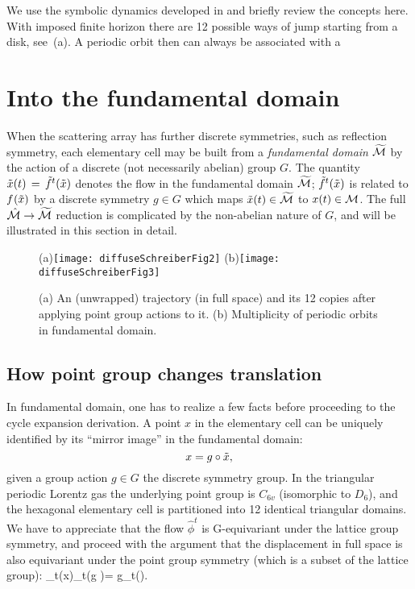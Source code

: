 \documentclass[aps,pre,showpacs,preprint,groupedaddress,floatfix]{revtex4-1}
\begin{document}
We use the symbolic dynamics developed in  and briefly
review the concepts here. With imposed finite horizon there are 12
possible ways of jump starting from a disk, see
\,(a). A periodic orbit then can always
be associated with a


\section{Into the fundamental domain\label{s-SymmetryReduction} }

When the scattering array has further discrete symmetries, such as
reflection symmetry, each elementary cell may be built from a {\em
fundamental domain} ${\widetilde {{\cal M}}}$ by the action of a discrete (not
necessarily abelian) group $G$. The quantity $\tilde x(t)\,=\,{\tilde{f}^{t}(\tilde x)}$
denotes the flow in the fundamental domain ${\widetilde {{\cal M}}}$;
${\tilde{f}^{t}(\tilde x)}$ is related to ${f^{}(\tilde x)}$ by a discrete symmetry $g
\in G$ which maps $\tilde x(t)\in {\widetilde {\ensuremath{{\cal M}}}}$ to ${x}(t) \in {\ensuremath{{\cal M}}}$. The
full $\hat {{\cal M}} \rightarrow {\widetilde {\ensuremath{{\cal M}}}}$ reduction is complicated by the
non-abelian nature of $G$, and will be illustrated in this section in
detail.

\begin{figure}[htbp]
  \begin{center}
    (a)\texttt{[image: diffuseSchreiberFig2]}
    (b)\texttt{[image: diffuseSchreiberFig3]}
  \end{center}
  \caption[]{ \label{fig:schrieberFig23} (a) An (unwrapped) trajectory
    (in full space) and its 12 copies after applying point group
    actions to it. (b) Multiplicity of periodic orbits in fundamental
    domain.}
\end{figure}

\subsection{How point group changes translation}


In fundamental domain, one has to realize a few facts before
proceeding to the cycle expansion derivation. A point $x$ in the
elementary cell can be uniquely identified by its ``mirror image'' in
the fundamental domain:
\[
x=g\circ\tilde x,
\]
given a group action $g\in G$ the discrete symmetry group. In the
triangular periodic Lorentz gas the underlying point group is $C_{6v}$
(isomorphic to $D_6$), and the hexagonal elementary cell is
partitioned into 12 identical triangular domains. We have to
appreciate that the flow $\hat{\phi}^t$ is G-equivariant under the lattice
group symmetry, and proceed with the argument that the displacement in
full space is also equivariant under the point group symmetry (which
is a subset of the lattice group): \beq \hn_t(x)\equiv\hn_t(g\circ
\tx)= g\circ\hn_t(\tx).  \eeq
\end{document}
